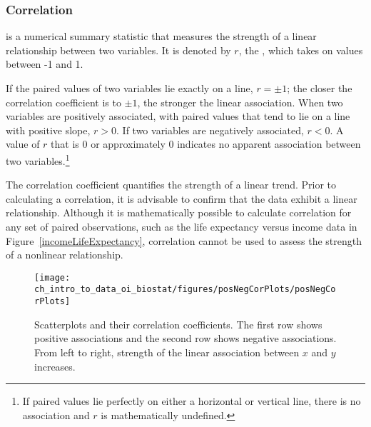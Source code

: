 
\subsubsection{Correlation}\label{subsectionCorrelation}

 is a numerical summary statistic that measures the strength of a linear relationship between two variables. It is denoted by $r$, the  , which takes on values between -1 and 1.

If the paired values of two variables lie exactly on a line, $r = \pm 1$; the closer the correlation coefficient is to $\pm 1$, the stronger the linear association. When two variables are positively associated, with paired values that tend to lie on a line with positive slope, $r > 0$. If two variables are negatively associated, $r < 0$. A value of $r$ that is 0 or approximately 0 indicates no apparent association between two variables.\footnote{If paired values lie perfectly on either a horizontal or vertical line, there is no association and $r$ is mathematically undefined.}

\textD{\newpage}

The correlation coefficient quantifies the strength of a linear trend. Prior to calculating a correlation, it is advisable to confirm that the data exhibit a linear relationship. Although it is mathematically possible to calculate correlation for any set of paired observations, such as the life expectancy versus income data in Figure~\ref{incomeLifeExpectancy}, correlation cannot be used to assess the strength of a nonlinear relationship.

\begin{figure}
	\centering
	\texttt{[image: ch\_intro\_to\_data\_oi\_biostat/figures/posNegCorPlots/posNegCorPlots]}
	\caption{Scatterplots and their correlation coefficients. The first row shows positive associations and the second row shows negative associations. From left to right, strength of the linear association between $x$ and $y$ increases.}
	\label{posNegCorPlots}
\end{figure}
                                                                                               
